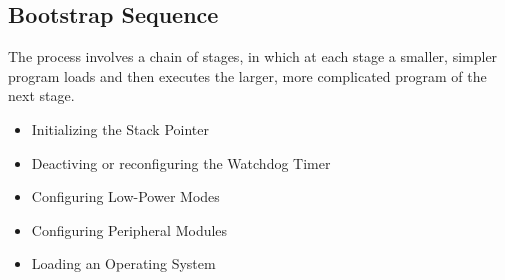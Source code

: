 \subsection{Bootstrap Sequence }
 The process involves a chain of stages, in which at each stage a smaller, simpler program loads and then executes the larger, more complicated program of the next stage.\\
\begin{itemize}
	\item Initializing the Stack Pointer
	\item Deactiving or reconfiguring the Watchdog Timer
	\item Configuring Low-Power Modes
	\item Configuring Peripheral Modules
	\item Loading an Operating System
\end{itemize}
\clearpage
\pagebreak